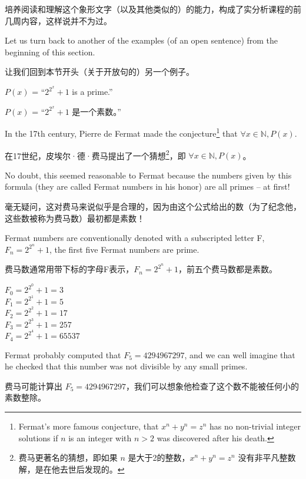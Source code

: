 培养阅读和理解这个象形文字（以及其他类似的）的能力，构成了实分析课程的前几周内容，这样说并不为过。

Let us turn back to another of the examples (of an open sentence) from the
beginning of this section.

让我们回到本节开头（关于开放句的）另一个例子。

$P(x)$ = ``$2^{2^x}+1$ is a prime.''

$P(x)$ = “$2^{2^x}+1$ 是一个素数。”

In the 17th century, Pierre de Fermat 
made the conjecture\footnote{Fermat's 
more famous conjecture, that $x^n+y^n=z^n$ has no non-trivial integer solutions
if $n$ is an integer with $n>2$ was discovered after his death. } that 
$\forall x \in {\mathbb N}, P(x)$.

在17世纪，皮埃尔·德·费马提出了一个猜想\footnote{费马更著名的猜想，即如果 $n$ 是大于2的整数，$x^n+y^n=z^n$ 没有非平凡整数解，是在他去世后发现的。}，即 $\forall x \in {\mathbb N}, P(x)$。

No doubt, this seemed reasonable to Fermat
because the numbers given by this formula (they are called 
Fermat numbers in
his honor) are all primes -- at first!

毫无疑问，这对费马来说似乎是合理的，因为由这个公式给出的数（为了纪念他，这些数被称为费马数）最初都是素数！

Fermat numbers are conventionally
denoted with a subscripted letter F,  $F_n = 2^{2^n}+1$, the first five
Fermat numbers are prime.

费马数通常用带下标的字母F表示，$F_n = 2^{2^n}+1$，前五个费马数都是素数。

\begin{center}
$\displaystyle F_0 = 2^{2^0}+1 = 3$\\
$\displaystyle F_1 = 2^{2^1}+1 = 5$\\
$\displaystyle F_2 = 2^{2^2}+1 = 17$\\
$\displaystyle F_3 = 2^{2^3}+1 = 257$\\
$\displaystyle F_4 = 2^{2^4}+1 = 65537$\\
\end{center}
 
Fermat probably computed that $F_5=4294967297$, and we can well imagine
that he checked that this number was not divisible by any small primes.

费马可能计算出 $F_5=4294967297$，我们可以想象他检查了这个数不能被任何小的素数整除。

